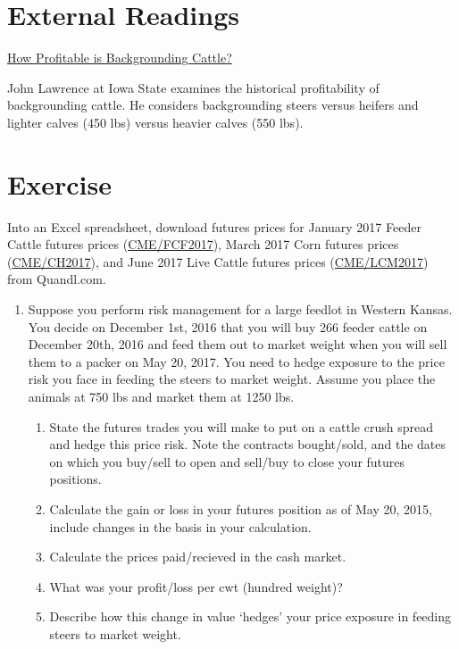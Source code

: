 \documentclass[
]{book}
\providecommand{\tightlist}{%
  \setlength{\itemsep}{0pt}\setlength{\parskip}{0pt}}
\begin{document}
\hypertarget{external-readings}{%
\section{External Readings}\label{external-readings}}

\href{http://www2.econ.iastate.edu/faculty/lawrence/Acrobat/Backgrounding\%20Cattle.pdf}{How Profitable is Backgrounding Cattle?}

John Lawrence at Iowa State examines the historical profitability of backgrounding cattle. He considers backgrounding steers versus heifers and lighter calves (450 lbs) versus heavier calves (550 lbs).

\hypertarget{exercise}{%
\section{Exercise}\label{exercise}}

Into an Excel spreadsheet, download futures prices for January 2017 Feeder Cattle futures prices (\href{https://www.quandl.com/data/CME/FCF2017}{CME/FCF2017}), March 2017 Corn futures prices (\href{https://www.quandl.com/data/CME/CH2017}{CME/CH2017}), and June 2017 Live Cattle futures prices (\href{https://www.quandl.com/data/CME/LCM2017}{CME/LCM2017}) from Quandl.com.

\begin{enumerate}
\def\labelenumi{\arabic{enumi}.}
\item
  Suppose you perform risk management for a large feedlot in Western Kansas. You decide on December 1st, 2016 that you will buy 266 feeder cattle on December 20th, 2016 and feed them out to market weight when you will sell them to a packer on May 20, 2017. You need to hedge exposure to the price risk you face in feeding the steers to market weight. Assume you place the animals at 750 lbs and market them at 1250 lbs.

  \begin{enumerate}
  \def\labelenumii{\alph{enumii}.}
  \tightlist
  \item
    State the futures trades you will make to put on a cattle crush spread and hedge this price risk. Note the contracts bought/sold, and the dates on which you buy/sell to open and sell/buy to close your futures positions.
  \item
    Calculate the gain or loss in your futures position as of May 20, 2015, include changes in the basis in your calculation.
  \item
    Calculate the prices paid/recieved in the cash market.
  \item
    What was your profit/loss per cwt (hundred weight)?
  \item
    Describe how this change in value `hedges' your price exposure in feeding steers to market weight.
  \end{enumerate}
\end{enumerate}
\end{document}
